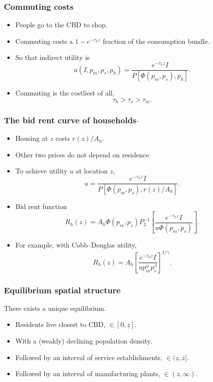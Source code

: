 \documentclass[compress,mathserif]{beamer}
\newcounter{perc}
\newcounter{percek}
\renewcommand{\time}[1]{\addtocounter{percek}{#1}}
\begin{document}
\begin{frame}\frametitle{Commuting costs}
\begin{itemize}
    \item People go to the CBD to shop.
    \item Commuting costs a $1-{e}^{-\tau_h z}$ fraction of the consumption bundle.
    \item So that indirect utility is
    \[
    u(I,p_m,p_s,p_h) = \frac{{e}^{-\tau_h z}I}{P[\Phi(p_m,p_s),p_h]}.
    \]
    \item Commuting is the costliest of all,
    \[
    \tau_h>\tau_s>\tau_m.
    \]
\end{itemize}
\end{frame}
\time{1}

\begin{frame}\frametitle{The bid rent curve of households$\cdot$}
\begin{itemize}
    \item Housing at $z$ costs $r(z)/A_h$.
    \item Other two prices do not depend on residence.
    \item To achieve utility $u$ at location $z$,
    \[
    u = \frac{{e}^{-\tau_h z} I}{P[\Phi(p_m,p_s),r(z)/A_h]}.
    \]
    \item Bid rent function
    \[
    R_h(z) = A_h\Phi(p_m,p_s)P_2^{-1}\left[\frac{{e}^{-\tau_h z} I}{u\Phi(p_m,p_s)}\right].
    \]
    \item For example, with Cobb--Douglas utility,
\[
R_h(z) = A_h\left[\frac{{e}^{-\tau_h z} I}{up_m^{\alpha}p_s^{\beta}}\right]^{1/\gamma}.
\]
\end{itemize}
\end{frame}

\begin{frame}\frametitle{Equilibrium spatial structure}
There exists a unique equilibrium.
\begin{itemize}
    \item Residents live closest to CBD, $\in[0,\underline{z}]$.
    \item With a (weakly) declining population density.
    \item Followed by an interval of service establishments, $\in(\underline{z},\overline{z}]$.
    \item Followed by an interval of manufacturing plants, $\in(\overline{z},\infty)$.
\end{itemize}
\end{frame}
\end{document}
